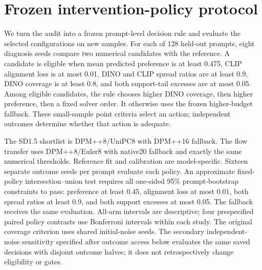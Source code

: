 \section{Frozen intervention-policy protocol}
\label{supp:policy_protocol}
We turn the audit into a frozen prompt-level decision rule and evaluate the
selected configurations on new samples. For each of 128 held-out prompts,
eight diagnosis seeds compare two numerical candidates with the reference.
A candidate is eligible when mean predicted preference is at least 0.475,
CLIP alignment loss is at most 0.01, DINO and CLIP spread ratios are at least
0.9, DINO coverage is at least 0.8, and both support-tail excesses are at most
0.05. Among eligible candidates, the rule chooses higher DINO coverage, then
higher preference, then a fixed solver order. It otherwise uses the frozen
higher-budget fallback. These small-sample point criteria select an action;
independent outcomes determine whether that action is adequate.

The SD1.5 shortlist is DPM++8/UniPC8 with DPM++16 fallback. The flow transfer
uses DPM++8/Euler8 with native20 fallback and exactly the same numerical
thresholds. Reference fit and calibration are model-specific. Sixteen separate
outcome seeds per prompt evaluate each policy. An approximate fixed-policy intersection--union
test\cite{berger1996intersection} requires all one-sided 95\% prompt-bootstrap constraints to pass:
preference at least 0.45, alignment loss at most 0.01, both spread ratios at
least 0.9, and both support excesses at most 0.05. The fallback receives the
same evaluation. All-arm intervals are descriptive; four prespecified paired
policy contrasts use Bonferroni intervals within each study. The original
coverage criterion uses shared initial-noise seeds. The secondary
independent-noise sensitivity specified after outcome access below evaluates the same saved decisions with
disjoint outcome halves; it does not retrospectively change eligibility or gates.

